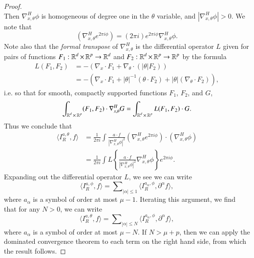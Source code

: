 \begin{proof}
\begin{equation}
    \end{equation}
    Then $\nabla_{x,\theta}^H \phi$ is homogeneous of degree one in the $\theta$ variable, and $|\nabla_{x,\theta}^H \phi| > 0$. We note that
    \begin{equation}
        (\nabla_{x,\theta}^H e^{2 \pi i \phi} ) = (2 \pi i) e^{2 \pi i \phi} \nabla_{x,\theta}^H \phi.
    \end{equation}
    Note also that the \emph{formal transpose} of $\nabla_{x,\theta}^H$ is the differential operator $L$ given for pairs of functions $F_1: \operatorname{\mathbb{R}}^d \times \operatorname{\mathbb{R}}^p \to \operatorname{\mathbb{R}}^d$ and $F_2: \operatorname{\mathbb{R}}^d \times \operatorname{\mathbb{R}}^p \to \operatorname{\mathbb{R}}^p$ by the formula
    \begin{equation}
    \begin{split}
        L(F_1, F_2) &= - ( \nabla_x \cdot F_1 + \nabla_\theta \cdot ( |\theta| F_2 ))\\
        &= - \left( \nabla_x \cdot F_1 + |\theta|^{-1} (\theta \cdot F_2) + |\theta| (\nabla_\theta \cdot F_2) \right),
    \end{split}
    \end{equation}
    i.e. so that for smooth, compactly supported functions $F_1$, $F_2$, and $G$,
    \begin{equation}
        \int_{\operatorname{\mathbb{R}}^d \times \operatorname{\mathbb{R}}^p} (F_1,F_2) \cdot \nabla^H_{x,\theta} G = \int_{\operatorname{\mathbb{R}}^d \times \operatorname{\mathbb{R}}^p} L(F_1,F_2) \cdot G.
    \end{equation}
    Thus we conclude that
    \begin{equation}
    \begin{split}
        \langle I^{a,\theta}_R, f \rangle &= \frac{1}{2 \pi i} \int \frac{a \cdot f}{|\nabla_{x,\theta}^H \phi|^2} \left( \nabla_{x,\theta}^H e^{2 \pi i \phi} \right) \cdot (\nabla_{x,\theta}^H \phi)\\
        &= \frac{1}{2 \pi i} \int L \left\{ \frac{a \cdot f}{|\nabla_{x,\theta}^H \phi|^2} \nabla_{x,\theta}^H \phi \right\} e^{2 \pi i \phi}.
    \end{split}
    \end{equation}
    Expanding out the differential operator $L$, we see we can write
    \begin{equation}
        \langle I^{a,\phi}_R, f \rangle = \sum\nolimits_{|\alpha| \leq 1} \langle I^{a_\alpha, \phi}_R, \partial^\alpha \! f \rangle,
    \end{equation}
    where $a_\alpha$ is a symbol of order at most $\mu - 1$. Iterating this argument, we find that for any $N > 0$, we can write
    \begin{equation}
        \langle I^{a,\theta}_R, f \rangle = \sum\nolimits_{|\alpha| \leq N} \langle I^{a_\alpha, \phi}_{R}, \partial^\alpha\! f \rangle,
    \end{equation}
    where $a_{\alpha}$ is a symbol of order at most $\mu - N$. If $N > \mu + p$, then we can apply the dominated convergence theorem to each term on the right hand side, from which the result follows.
\end{proof}









